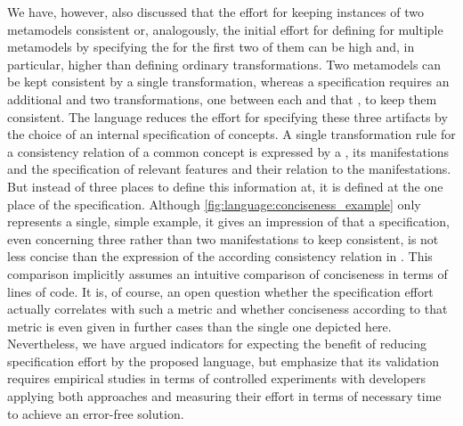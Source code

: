 We have, however, also discussed that the effort for keeping instances of two metamodels consistent or, analogously, the initial effort for defining \commonalities for multiple metamodels by specifying the \commonalities for the first two of them can be high and, in particular, higher than defining ordinary transformations.
Two metamodels can be kept consistent by a single transformation, whereas a \commonalities specification requires an additional \conceptmetamodel and two transformations, one between each \concretemetamodel and that \conceptmetamodels, to keep them consistent.
The \commonalities language reduces the effort for specifying these three artifacts by the choice of an internal specification of concepts.
A single transformation rule for a consistency relation of a common concept is expressed by a \commonality, its manifestations and the specification of relevant features and their relation to the manifestations.
But instead of three places to define this information at, it is defined at the one place of the \commonality specification.
Although \autoref{fig:language:conciseness_example} only represents a single, simple example, it gives an impression of that a \commonalities specification, even concerning three rather than two manifestations to keep consistent, is not less concise than the expression of the according consistency relation in \qvtr.
This comparison implicitly assumes an intuitive comparison of conciseness in terms of lines of code.
It is, of course, an open question whether the specification effort actually correlates with such a metric and whether conciseness according to that metric is even given in further cases than the single one depicted here.
Nevertheless, we have argued indicators for expecting the benefit of reducing specification effort by the proposed language, but emphasize that its validation requires empirical studies in terms of controlled experiments with developers applying both approaches and measuring their effort in terms of necessary time to achieve an error-free solution.




